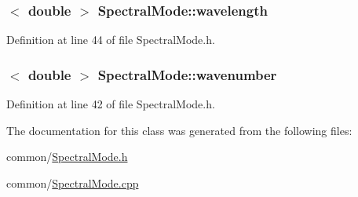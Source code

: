 \hypertarget{classSpectralMode_ac56b7c0c01e1f396bef1b192b6365add}{
\subsubsection[{wavelength}]{$<$ double $>$ {\bf SpectralMode::wavelength}}}
\label{classSpectralMode_ac56b7c0c01e1f396bef1b192b6365add}


Definition at line 44 of file SpectralMode.h.

\hypertarget{classSpectralMode_aa843aedc510953af4fb64b4dd41e3e22}{
\subsubsection[{wavenumber}]{$<$ double $>$ {\bf SpectralMode::wavenumber}}}
\label{classSpectralMode_aa843aedc510953af4fb64b4dd41e3e22}


Definition at line 42 of file SpectralMode.h.



The documentation for this class was generated from the following files:\begin{DoxyCompactItemize}
\item 
common/\hyperlink{SpectralMode_8h}{SpectralMode.h}\item 
common/\hyperlink{SpectralMode_8cpp}{SpectralMode.cpp}\end{DoxyCompactItemize}
